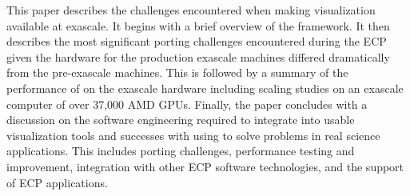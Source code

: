 This paper describes the challenges encountered when making visualization available at exascale.
It begins with a brief overview of the \vtkm framework.
It then describes the most significant porting challenges encountered during the ECP given the hardware for the production exascale machines differed dramatically from the pre-exascale machines.
This is followed by a summary of the performance of \vtkm on the exascale hardware including scaling studies on an exascale computer of over 37,000 AMD GPUs.
Finally, the paper concludes with a discussion on the software engineering required to integrate \vtkm into usable visualization tools and successes with using \vtkm to solve problems in real science applications.
This includes porting challenges, performance testing and improvement, integration with other ECP software technologies, and the support of ECP applications.
